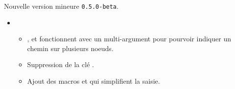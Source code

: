Nouvelle version mineure \verb+0.5.0-beta+.

\begin{itemize}[itemsep=.5em]
    \item {}
    \begin{itemize}[itemsep=.5em]
        \item {},  et  fonctionnent avec un multi-argument pour pourvoir indiquer un chemin sur plusieurs noeuds.
        
        \item Suppression de la clé .
        
        \item Ajout des macros  et  qui simplifient la saisie.
    \end{itemize}
\end{itemize}

\separation
